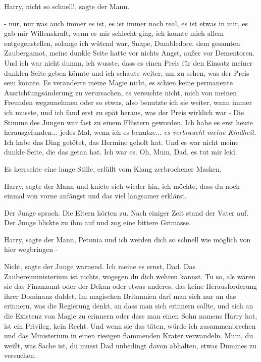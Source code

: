 \glqq Harry, nicht so schnell!\grqq{}, sagte der Mann.

\glqq - nur, nur was auch immer es ist, es ist immer noch real, es ist etwas in
mir, es gab mir Willenskraft, wenn es mir schlecht ging, ich konnte mich allem
entgegenstellen, solange ich wütend war, Snape, Dumbledore, dem gesamten
Zaubergamot, meine dunkle Seite hatte vor nichts Angst, außer vor Dementoren.
Und ich war nicht dumm, ich wusste, dass es einen Preis für den Einsatz meiner
dunklen Seite geben könnte und ich schaute weiter, um zu sehen, was der Preis
sein könnte. Es veränderte meine Magie nicht, es schien keine permanente
Ausrichtungsänderung zu verursachen, es versuchte nicht, mich von meinen
Freunden wegzunehmen oder so etwas, also benutzte ich sie weiter, wann immer ich
musste, und ich fand erst zu spät heraus, was der Preis wirklich war -\grqq{}
Die Stimme des Jungen war fast zu einem Flüstern geworden. \glqq Ich habe es
erst heute herausgefunden... jedes Mal, wenn ich es benutze... \emph{es
verbraucht meine Kindheit}. Ich habe das Ding getötet, das Hermine geholt hat.
Und es war nicht meine dunkle Seite, die das getan hat. Ich war es. Oh, Mum,
Dad, es tut mir leid.\grqq{}

Es herrschte eine lange Stille, erfüllt vom Klang zerbrochener Masken.

\glqq Harry\grqq{}, sagte der Mann und kniete sich wieder hin, \glqq ich möchte,
dass du noch einmal von vorne anfängst und das viel langsamer erklärst.\grqq{}

Der Junge sprach. Die Eltern hörten zu. Nach einiger Zeit stand der Vater auf.
Der Junge blickte zu ihm auf und zog eine bittere Grimasse.

\glqq Harry\grqq{}, sagte der Mann, \glqq Petunia und ich werden dich so schnell
wie möglich von hier wegbringen -\grqq{}

\glqq Nicht\grqq{}, sagte der Junge warnend. \glqq Ich meine es ernst, Dad. Das
Zaubereiministerium ist nichts, wogegen du dich wehren kannst. Tu so, als wären
sie das Finanzamt oder der Dekan oder etwas anderes, das keine Herausforderung
ihrer Dominanz duldet. Im magischen Britannien darf man sich nur an das
erinnern, was die Regierung denkt, an dass man sich erinnern sollte, und sich an
die Existenz von Magie zu erinnern oder dass man einen Sohn namens Harry hat,
ist ein Privileg, kein Recht. Und wenn sie das täten, würde ich zusammenbrechen
und das Ministerium in einen riesigen flammenden Krater verwandeln. Mum, du
weißt, was Sache ist, du musst Dad unbedingt davon abhalten, etwas Dummes zu
versuchen.\grqq{}

